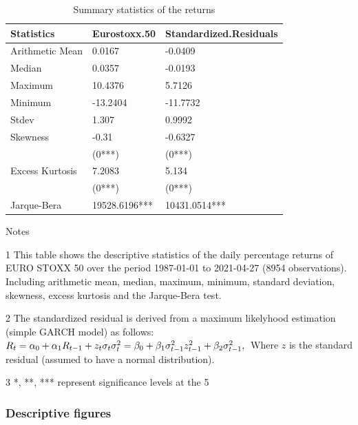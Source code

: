 \documentclass[a4paper, twoside]{templates/ociamthesis}
\begin{document}
\begin{table}[h!]

\caption{\label{tab:dsTable}Summary statistics of the returns}
\centering
\begin{threeparttable}
\begin{tabular}[t]{lll}
\toprule
Statistics & Eurostoxx.50 & Standardized.Residuals\\
\midrule
Arithmetic Mean & 0.0167 & -0.0409\\
Median & 0.0357 & -0.0193\\
Maximum & 10.4376 & 5.7126\\
Minimum & -13.2404 & -11.7732\\
Stdev & 1.307 & 0.9992\\
\addlinespace
Skewness & -0.31 & -0.6327\\
 & (0***) & (0***)\\
Excess Kurtosis & 7.2083 & 5.134\\
 & (0***) & (0***)\\
Jarque-Bera & 19528.6196*** & 10431.0514***\\
\bottomrule
\end{tabular}
\begin{tablenotes}
\item Notes
\item[1] This table shows the descriptive statistics of the daily percentage returns of EURO STOXX 50 over the period 1987-01-01 to 2021-04-27 (8954 observations). Including arithmetic mean, median, maximum, minimum, standard deviation, skewness, excess kurtosis and the Jarque-Bera test.
\item[2] The standardized residual is derived from a maximum likelyhood estimation (simple GARCH model) as follows:  $ R_t=\alpha_0+\alpha_1 R_{t-1}+z_t \sigma_t \\ \sigma_t^2=\beta_0+\beta_1 \sigma_{t-1}^2 z_{t-1}^2+\beta_2 \sigma_{t-1}^2, \\$ Where $z$ is the standard residual (assumed to have a normal distribution).
\item[3] *, **, *** represent significance levels at the 5%
\end{tablenotes}
\end{threeparttable}
\end{table}

\hypertarget{descriptive-figures}{%
\subsubsection{Descriptive figures}\label{descriptive-figures}}
\end{document}
